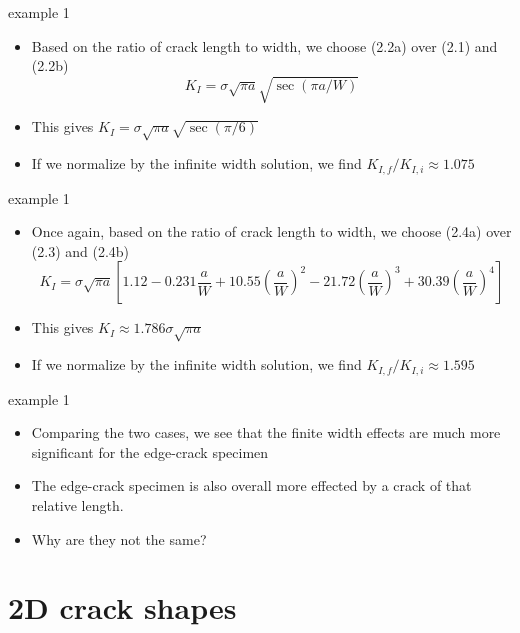 \documentclass[10pt]{beamer}
\begin{document}
\begin{frame}{example 1}
	\begin{itemize}
		\item Based on the ratio of crack length to width, we choose (2.2a) over (2.1) and (2.2b)
		\begin{equation*}
		K_I = \sigma \sqrt{\pi a} \sqrt{\sec (\pi a/W)}
		\end{equation*}
		\item This gives $K_I = \sigma \sqrt{\pi a} \sqrt{\sec (\pi/6)}$
		\item If we normalize by the infinite width solution, we find $K_{I,f}/K_{I,i} \approx 1.075$
	\end{itemize}
\end{frame}

\begin{frame}{example 1}
	\begin{itemize}
		\item Once again, based on the ratio of crack length to width, we choose (2.4a) over (2.3) and (2.4b)
		\begin{equation*}
		K_I = \sigma \sqrt{\pi a}\left[1.12 - 0.231 \frac{a}{W} + 10.55 \left(\frac{a}{W}\right)^2 - 21.72 \left(\frac{a}{W}\right)^3 + 30.39 \left(\frac{a}{W}\right)^4\right]
		\end{equation*}
		\item This gives $K_I \approx 1.786 \sigma \sqrt{\pi a}$
		\item If we normalize by the infinite width solution, we find $K_{I,f}/K_{I,i} \approx 1.595$
	\end{itemize}
\end{frame}

\begin{frame}{example 1}
	\begin{itemize}
		\item Comparing the two cases, we see that the finite width effects are much more significant for the edge-crack specimen
		\item The edge-crack specimen is also overall more effected by a crack of that relative length.
		\item Why are they not the same?
	\end{itemize}
\end{frame}

\section{2D crack shapes}
\end{document}
